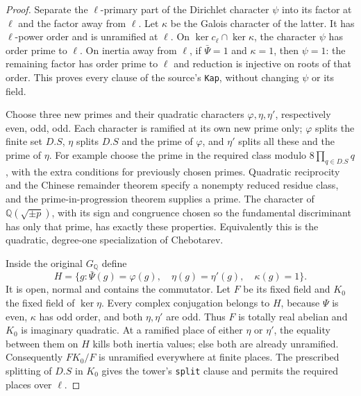 \begin{proof}
Separate the $\ell$-primary part of the Dirichlet character
$\psi$ into its factor at $\ell$ and the factor away from
$\ell$.  Let $\kappa$ be the Galois character of the latter.
It has $\ell$-power order and is unramified at $\ell$.  On
$\ker c_\ell\cap\ker\kappa$, the character $\psi$ has order
prime to $\ell$.  On inertia away from $\ell$, if
$\bar\Psi=1$ and $\kappa=1$, then $\psi=1$: the remaining
factor has order prime to $\ell$ and reduction is injective
on roots of that order.  This proves every clause of the
source's \texttt{Kap}, without changing $\psi$ or its field.

Choose three new primes and their quadratic characters
$\varphi,\eta,\eta'$, respectively even, odd, odd.  Each
character is ramified at its own new prime only; $\varphi$
splits the finite set $D.S$, $\eta$ splits $D.S$ and the
prime of $\varphi$, and $\eta'$ splits all these and the
prime of $\eta$.  For example choose the prime in the
required class modulo $8\prod_{q\in D.S}q$, with the extra
conditions for previously chosen primes.  Quadratic
reciprocity and the Chinese remainder theorem specify a
nonempty reduced residue class, and the prime-in-progression
theorem supplies a prime.  The character of
$\mathbb Q(\sqrt{\pm p})$, with its sign and congruence
chosen so the fundamental discriminant has only that prime,
has exactly these properties.  Equivalently this is the
quadratic, degree-one specialization of Chebotarev.

Inside the original $G_{\mathbb Q}$ define
\[
 H=\{g:\bar\Psi(g)=\varphi(g),\quad
                 \eta(g)=\eta'(g),\quad\kappa(g)=1\}.
 \tag{UX.5}
\]
It is open, normal and contains the commutator.  Let $F$ be
its fixed field and $K_0$ the fixed field of $\ker\eta$.
Every complex conjugation belongs to $H$, because $\Psi$ is
even, $\kappa$ has odd order, and both $\eta,\eta'$ are odd.
Thus $F$ is totally real abelian and $K_0$ is imaginary
quadratic.  At a ramified place of either $\eta$ or $\eta'$,
the equality between them on $H$ kills both inertia values;
else both are already unramified.  Consequently $FK_0/F$
is unramified everywhere at finite places.  The prescribed
splitting of $D.S$ in $K_0$ gives the tower's \texttt{split}
clause and permits the required places over $\ell$.


\end{proof}
